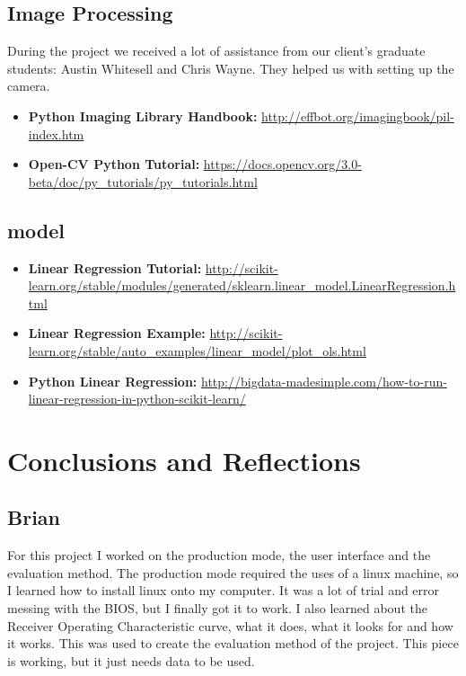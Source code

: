 \documentclass[onecolumn, draftclsnofoot,10pt, compsoc]{IEEEtran}
\begin{document}
		\subsection{Image Processing}
		During the project we received a lot of assistance from our client's graduate students: Austin Whitesell and Chris Wayne. They helped us with setting up the camera.   
		\begin{itemize}
			\item \textbf{Python Imaging Library Handbook:}    \url{http://effbot.org/imagingbook/pil-index.htm}
			\item \textbf{Open-CV Python Tutorial:}    \url{https://docs.opencv.org/3.0-beta/doc/py_tutorials/py_tutorials.html}
		\end{itemize}
		\subsection{model}
		\begin{itemize}
			\item \textbf{Linear Regression Tutorial:}    \url{http://scikit-learn.org/stable/modules/generated/sklearn.linear_model.LinearRegression.html}
			\item \textbf{Linear Regression Example:}    \url{http://scikit-learn.org/stable/auto_examples/linear_model/plot_ols.html}
			\item \textbf{Python Linear Regression:}    \url{http://bigdata-madesimple.com/how-to-run-linear-regression-in-python-scikit-learn/}
		\end{itemize}
	\section{Conclusions and Reflections}
	
	\subsection{Brian}
	For this project I worked on the production mode, the user interface and the evaluation method. The production mode required the uses of a linux machine, so I learned how to install linux onto my computer. It was a lot of trial and error messing with the BIOS, but I finally got it to work. I also learned about the Receiver Operating Characteristic curve, what it does, what it looks for and how it works. This was used to create the evaluation method of the project. This piece is working, but it just needs data to be used. 
	
\end{document}
